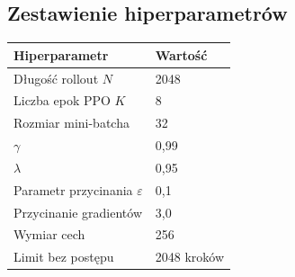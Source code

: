 \documentclass[12pt,a4paper,twocolumn]{article}
\begin{document}
\subsection{Zestawienie hiperparametrów}

\begin{center}
\begin{tabular}{@{}ll@{}}
  \toprule
  Hiperparametr & Wartość \\
  \midrule
  Długość rollout $N$ & 2048 \\
  Liczba epok PPO $K$ & 8 \\
  Rozmiar mini-batcha & 32 \\
  $\gamma$ & 0,99 \\
  $\lambda$ & 0,95 \\
  Parametr przycinania $\varepsilon$ & 0,1 \\
  Przycinanie gradientów & 3,0 \\
  Wymiar cech & 256 \\
  Limit bez postępu & 2048 kroków \\
  \bottomrule
\end{tabular}
\end{center}
\end{document}
